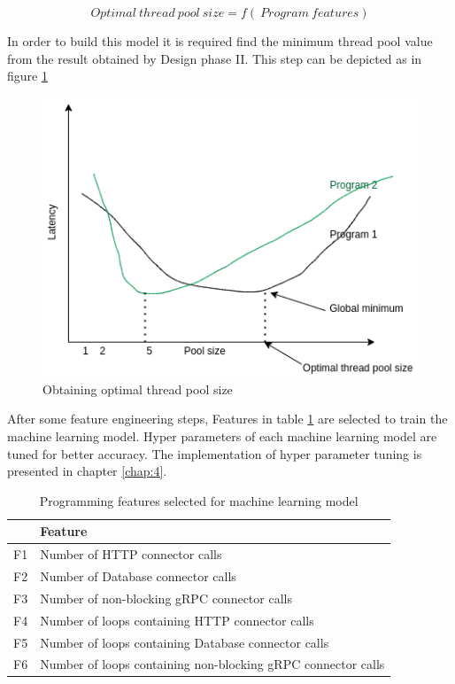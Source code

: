 $$ Optimal\:thread\:pool\:size = f(\:Program\:features)$$

In order to build this model it is required find the minimum thread pool value from the result obtained by Design phase II. This step can be depicted as in figure \ref{optimal_pool_size}

\begin{figure}[htbp]
	\begin{center}
		\includegraphics[scale=0.5]{figures/optimal_pool_size.png}
	\end{center}
	\caption{Obtaining optimal thread pool size}
	\label{optimal_pool_size}
\end{figure}

After some feature engineering steps, Features in table \ref{tab:programming-features}  are selected to train the machine learning model. Hyper parameters of each machine learning model are tuned for better accuracy. The implementation of hyper parameter tuning is presented in chapter \ref{chap:4}.

\begin{table}[]
	\caption{Programming features selected for machine learning model}
	\label{tab:programming-features}
	\begin{tabular}{|l|l|}
		\hline
		& Feature                                                      \\ \hline
		F1 & Number of HTTP connector calls                               \\ \hline
		F2 & Number of Database connector calls                           \\ \hline
		F3 & Number of non-blocking gRPC connector calls                  \\ \hline
		F4 & Number of loops containing HTTP connector calls              \\ \hline
		F5 & Number of loops containing Database connector calls          \\ \hline
		F6 & Number of loops containing non-blocking gRPC connector calls \\ \hline
	\end{tabular}
\end{table}

